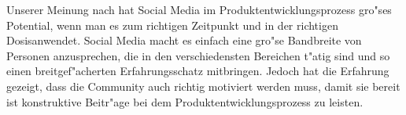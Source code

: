 Unserer Meinung nach hat Social Media im Produktentwicklungsprozess gro"ses Potential, wenn man es zum richtigen Zeitpunkt und in der richtigen \glqq Dosis\grqq anwendet. Social Media macht es einfach eine gro"se Bandbreite von Personen anzusprechen, die in den verschiedensten Bereichen t"atig sind und so einen breitgef"acherten Erfahrungsschatz mitbringen. Jedoch hat die Erfahrung gezeigt, dass die Community auch richtig motiviert werden muss, damit sie bereit ist konstruktive Beitr"age bei dem Produktentwicklungsprozess zu leisten.